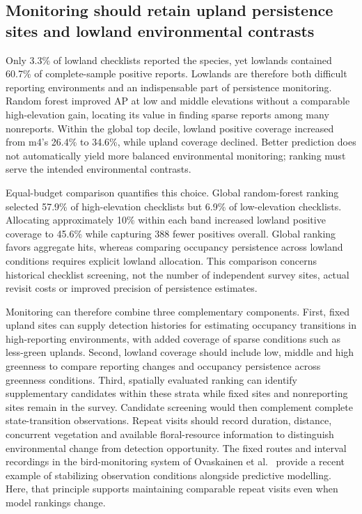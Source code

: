 \subsection{Monitoring should retain upland persistence sites and lowland environmental contrasts}
Only 3.3\% of lowland checklists reported the species, yet lowlands contained 60.7\% of complete-sample positive reports. Lowlands are therefore both difficult reporting environments and an indispensable part of persistence monitoring. Random forest improved AP at low and middle elevations without a comparable high-elevation gain, locating its value in finding sparse reports among many nonreports. Within the global top decile, lowland positive coverage increased from m4's 26.4\% to 34.6\%, while upland coverage declined. Better prediction does not automatically yield more balanced environmental monitoring; ranking must serve the intended environmental contrasts.

Equal-budget comparison quantifies this choice. Global random-forest ranking selected 57.9\% of high-elevation checklists but 6.9\% of low-elevation checklists. Allocating approximately 10\% within each band increased lowland positive coverage to 45.6\% while capturing 388 fewer positives overall. Global ranking favors aggregate hits, whereas comparing occupancy persistence across lowland conditions requires explicit lowland allocation. This comparison concerns historical checklist screening, not the number of independent survey sites, actual revisit costs or improved precision of persistence estimates.

Monitoring can therefore combine three complementary components. First, fixed upland sites can supply detection histories for estimating occupancy transitions in high-reporting environments, with added coverage of sparse conditions such as less-green uplands. Second, lowland coverage should include low, middle and high greenness to compare reporting changes and occupancy persistence across greenness conditions. Third, spatially evaluated ranking can identify supplementary candidates within these strata while fixed sites and nonreporting sites remain in the survey. Candidate screening would then complement complete state-transition observations. Repeat visits should record duration, distance, concurrent vegetation and available floral-resource information to distinguish environmental change from detection opportunity. The fixed routes and interval recordings in the bird-monitoring system of Ovaskainen et al.~\cite{ovaskainen2026} provide a recent example of stabilizing observation conditions alongside predictive modelling. Here, that principle supports maintaining comparable repeat visits even when model rankings change.

